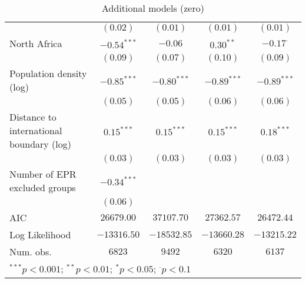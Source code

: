 \begin{sidewaystable}
\begin{center}
{\begin{tabular}{l c c c c}
                                         & $(0.02)$      & $(0.01)$      & $(0.01)$       & $(0.01)$        \\
North Africa                             & $-0.54^{***}$ & $-0.06$       & $0.30^{**}$    & $-0.17^{\cdot}$ \\
                                         & $(0.09)$      & $(0.07)$      & $(0.10)$       & $(0.09)$        \\
Population density (log)                 & $-0.85^{***}$ & $-0.80^{***}$ & $-0.89^{***}$  & $-0.89^{***}$   \\
                                         & $(0.05)$      & $(0.05)$      & $(0.06)$       & $(0.06)$        \\
Distance to international boundary (log) & $0.15^{***}$  & $0.15^{***}$  & $0.15^{***}$   & $0.18^{***}$    \\
                                         & $(0.03)$      & $(0.03)$      & $(0.03)$       & $(0.03)$        \\
Number of EPR excluded groups            & $-0.34^{***}$ &               &                &                 \\
                                         & $(0.06)$      &               &                &                 \\
\midrule
AIC                                      & $26679.00$    & $37107.70$    & $27362.57$     & $26472.44$      \\
Log Likelihood                           & $-13316.50$   & $-18532.85$   & $-13660.28$    & $-13215.22$     \\
Num. obs.                                & $6823$        & $9492$        & $6320$         & $6137$          \\
\bottomrule
\multicolumn{5}{l}{\scriptsize{$^{***}p<0.001$; $^{**}p<0.01$; $^{*}p<0.05$; $^{\cdot}p<0.1$}}
\end{tabular}
}
\caption{Additional models (zero)}
\label{robustz}
\end{center}
\end{sidewaystable}
